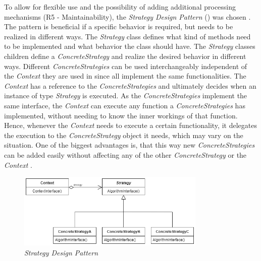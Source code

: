 To allow for flexible use and the possibility of adding additional processing mechanisms (R5 - Maintainability), the \textit{Strategy Design Pattern} () was chosen \cite{gamma1994design}.
The pattern is beneficial if a specific behavior is required, but needs to be realized in different ways.
The \textit{Strategy} class defines what kind of methods need to be implemented and what behavior the class should have.
The \textit{Strategy} classes children define a \textit{ConcreteStrategy} and realize the desired behavior in different ways.
Different \textit{ConcreteStrategies} can be used interchangeably independent of the \textit{Context} they are used in since all implement the same functionalities.
The \textit{Context} has a reference to the \textit{ConcreteStrategies} and ultimately decides when an instance of type \textit{Strategy} is executed.
As the \textit{ConcreteStrategies} implement the same interface, the \textit{Context} can execute any function a \textit{ConcreteStrategies} has implemented, without needing to know the inner workings of that function.
Hence, whenever the \textit{Context} needs to execute a certain functionality, it delegates the execution to the \textit{ConcreteStrategy} object it needs, which may vary on the situation.
One of the biggest advantages is, that this way new \textit{ConcreteStrategies} can be added easily without affecting any of the other \textit{ConcreteStrategy} or the \textit{Context} \cite{gamma1994design}.

\begin{figure}[h]
	\centering
	\includegraphics[width=0.8\textwidth]{images/strategy.png}
	\caption[Strategy Design Pattern]{\textit{Strategy Design Pattern} \cite[p. 316]{gamma1994design}}
	\label{fig:design}
\end{figure}

